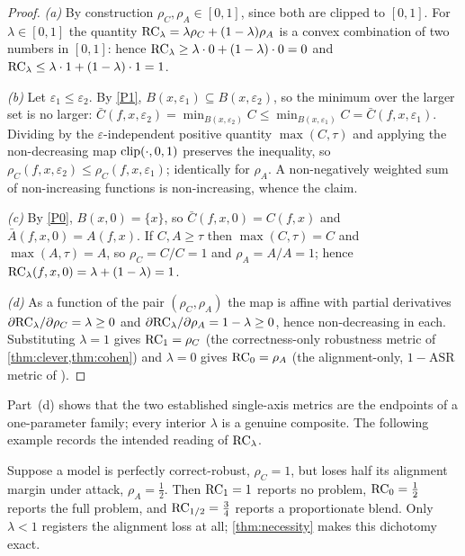 \begin{proof}
\emph{(a)} By construction $\rho_C,\rho_A\in[0,1]$, since both are clipped to
$[0,1]$. For $\lambda\in[0,1]$ the quantity $\mathrm{RC}_\lambda=\lambda\rho_C+(1-\lambda)
\rho_A$ is a convex combination of two numbers in $[0,1]$: hence
$\mathrm{RC}_\lambda\ge\lambda\cdot0+(1-\lambda)\cdot0=0$ and
$\mathrm{RC}_\lambda\le\lambda\cdot1+(1-\lambda)\cdot1=1$.

\emph{(b)} Let $\varepsilon_1\le\varepsilon_2$. By \ref{P1},
$B(x,\varepsilon_1)\subseteq B(x,\varepsilon_2)$, so the minimum over the larger set
is no larger:
$\bar C(f,x,\varepsilon_2)=\min_{B(x,\varepsilon_2)}C
\le\min_{B(x,\varepsilon_1)}C=\bar C(f,x,\varepsilon_1)$. Dividing by the
$\varepsilon$-independent positive quantity $\max(C,\tau)$ and applying the
non-decreasing map $\mathrm{clip}(\cdot,0,1)$ preserves the inequality, so
$\rho_C(f,x,\varepsilon_2)\le\rho_C(f,x,\varepsilon_1)$; identically for $\rho_A$. A
non-negatively weighted sum of non-increasing functions is non-increasing, whence
the claim.

\emph{(c)} By \ref{P0}, $B(x,0)=\{x\}$, so $\bar C(f,x,0)=C(f,x)$ and
$\bar A(f,x,0)=A(f,x)$. If $C,A\ge\tau$ then $\max(C,\tau)=C$ and $\max(A,\tau)=A$,
so $\rho_C=C/C=1$ and $\rho_A=A/A=1$; hence
$\mathrm{RC}_\lambda(f,x,0)=\lambda+(1-\lambda)=1$.

\emph{(d)} As a function of the pair $(\rho_C,\rho_A)$ the map is affine with
partial derivatives $\partial\mathrm{RC}_\lambda/\partial\rho_C=\lambda\ge0$ and
$\partial\mathrm{RC}_\lambda/\partial\rho_A=1-\lambda\ge0$, hence non-decreasing in each.
Substituting $\lambda=1$ gives $\mathrm{RC}_1=\rho_C$ (the correctness-only robustness
metric of \cref{thm:clever,thm:cohen}) and $\lambda=0$ gives $\mathrm{RC}_0=\rho_A$ (the
alignment-only, $1-\mathrm{ASR}$ metric of \cite{Chao2024}).
\end{proof}

Part~(d) shows that the two established single-axis metrics are the endpoints of a
one-parameter family; every interior $\lambda$ is a genuine composite. The
following example records the intended reading of $\mathrm{RC}_\lambda$.

\begin{example}\label{ex:reading}
Suppose a model is perfectly correct-robust, $\rho_C=1$, but loses half its
alignment margin under attack, $\rho_A=\tfrac12$. Then
$\mathrm{RC}_{1}=1$ reports no problem, $\mathrm{RC}_{0}=\tfrac12$ reports the full problem, and
$\mathrm{RC}_{1/2}=\tfrac34$ reports a proportionate blend. Only $\lambda<1$ registers the
alignment loss at all; \cref{thm:necessity} makes this dichotomy exact.
\end{example}

